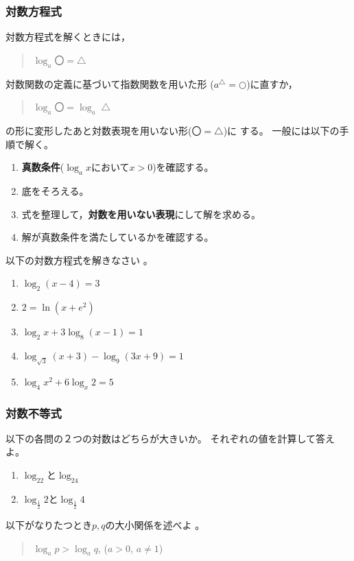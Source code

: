 \documentclass[twocolumn,11pt]{jarticle}
\begin{document}
\subsubsection{対数方程式}
対数方程式を解くときには，
\begin{quote}
  $\log_a〇=△$
\end{quote}
対数関数の定義に基づいて指数関数を用いた形
($a^△=○$)に直すか，
\begin{quote}
  $\log_a〇=\log_a△$
\end{quote}
の形に変形したあと対数表現を用いない形($〇=△$)に
する。
一般には以下の手順で解く。
\begin{enumerate}
\item \textbf{真数条件}($\log_ax$において$x>0$)を確認する。
\item 底をそろえる。
\item 式を整理して，\textbf{対数を用いない表現}にして解を求める。
\item 解が真数条件を満たしているかを確認する。
\end{enumerate}
\exercise
以下の対数方程式を解きなさい
。
\begin{enumerate}
\item $\log_2(x-4)=3$
\item $2=\ln (x+e^2)$
\item $\log_2x+3\log_8(x-1)=1$
\item $\log_{\sqrt{3}}(x+3)-\log_9(3x+9)=1$
\item $\log_4x^2+6\log_x2=5$
\end{enumerate}

\subsubsection{対数不等式}
\nquestion
以下の各問の２つの対数はどちらが大きいか。
それぞれの値を計算して答えよ。
\begin{enumerate}
\item $\log_22$と$\log_24$
\item $\log_\frac{1}{2}2$と$\log_\frac{1}{2}4$
\end{enumerate}
\nquestion
以下がなりたつとき$p,q$の大小関係を述べよ
。
\begin{quote}
$\log_ap>\log_aq$, ($a>0$, $a\ne1$)
\end{quote}
\end{document}
